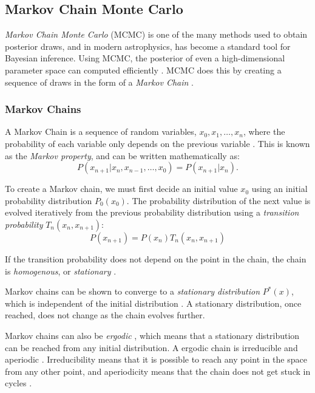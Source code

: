 \documentclass[preprint,longauthor]{aastex631}
\numberwithin{equation}{section}
\begin{document}
\subsection{Markov Chain Monte Carlo}
\textit{Markov Chain Monte Carlo} (MCMC) is one of the many methods used to obtain posterior draws, and in modern astrophysics, has become a standard tool for Bayesian inference. Using MCMC, the posterior of even a high-dimensional parameter space can computed efficiently \citep{trottaBayesSkyBayesian2008}. MCMC does this by creating a sequence of draws in the form of a \textit{Markov Chain} \citep{neal1993probabilistic}.

\subsubsection{Markov Chains}

A Markov Chain is a sequence of random variables, $x_0, x_1, \hdots, x_n$, where the probability of each variable only depends on the previous variable \citep{neal1993probabilistic}. This is known as the \textit{Markov property}, and can be written mathematically as:
\begin{equation}
  P(x_{n+1}|x_n,x_{n-1},\hdots,x_0) = P(x_{n+1}|x_n).
\end{equation}

To create a Markov chain, we must first decide an initial value $x_0$ using an initial probability distribution $P_0(x_0)$. The probability distribution of the next value is evolved iteratively from the previous probability distribution using a \textit{transition probability} \citep{neal1993probabilistic} $T_n(x_n,x_{n+1})$:
\begin{equation}
  P(x_{n+1}) = P(x_n)T_n(x_n,x_{n+1})
\end{equation}

If the transition probability does not depend on the point in the chain, the chain is \textit{homogenous}, or \textit{stationary} \citep{neal1993probabilistic}.

Markov chains can be shown to converge to a \textit{stationary distribution} $P^*(x)$, which is independent of the initial distribution \citep{trottaBayesSkyBayesian2008}. A stationary distribution, once reached, does not change as the chain evolves further.

Markov chains can also be \textit{ergodic} \citep{neal1993probabilistic}, which means that a stationary distribution can be reached from any initial distribution. A ergodic chain is irreducible and aperiodic \citep{neal1993probabilistic}. Irreducibility means that it is possible to reach any point in the space from any other point, and aperiodicity means that the chain does not get stuck in cycles \citep{vontoussaintBayesianInferencePhysics2011}.
\end{document}
